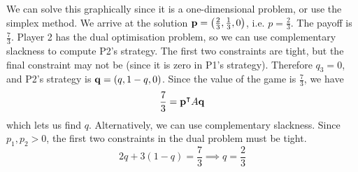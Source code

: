 \begin{example}
	We can solve this graphically since it is a one-dimensional problem, or use the simplex method.
	We arrive at the solution \( \vb p = \qty(\frac{2}{3}, \frac{1}{3}, 0) \), i.e.
	\( p = \frac{2}{3} \).
	The payoff is \( \frac{7}{3} \).
	Player 2 has the dual optimisation problem, so we can use complementary slackness to compute P2's strategy.
	The first two constraints are tight, but the final constraint may not be (since it is zero in P1's strategy).
	Therefore \( q_3 = 0 \), and P2's strategy is \( \vb q = (q, 1-q, 0) \).
	Since the value of the game is \( \frac{7}{3} \), we have
	\[
		\frac{7}{3} = \vb p^\intercal A \vb q
	\]
	which lets us find \( q \).
	Alternatively, we can use complementary slackness.
	Since \( p_1, p_2 > 0 \), the first two constraints in the dual problem must be tight.
	\[
		2q + 3(1-q) = \frac{7}{3} \implies q = \frac{2}{3}
	\]
\end{example}
